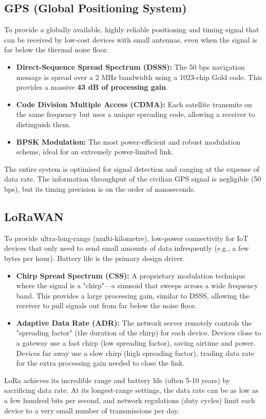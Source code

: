 \subsection{GPS (Global Positioning System)}

 To provide a globally available, highly reliable positioning and timing signal that can be received by low-cost devices with small antennas, even when the signal is far below the thermal noise floor.
\begin{itemize}
    \item \textbf{Direct-Sequence Spread Spectrum (DSSS):} The 50 bps navigation message is spread over a 2 MHz bandwidth using a 1023-chip Gold code. This provides a massive \textbf{43 dB of processing gain}.
    \item \textbf{Code Division Multiple Access (CDMA):} Each satellite transmits on the same frequency but uses a unique spreading code, allowing a receiver to distinguish them.
    \item \textbf{BPSK Modulation:} The most power-efficient and robust modulation scheme, ideal for an extremely power-limited link.
\end{itemize}
 The entire system is optimised for signal detection and ranging at the expense of data rate. The information throughput of the civilian GPS signal is negligible (50 bps), but its timing precision is on the order of nanoseconds.


\subsection{LoRaWAN}

 To provide ultra-long-range (multi-kilometre), low-power connectivity for IoT devices that only need to send small amounts of data infrequently (e.g., a few bytes per hour). Battery life is the primary design driver.
\begin{itemize}
    \item \textbf{Chirp Spread Spectrum (CSS):} A proprietary modulation technique where the signal is a "chirp"—a sinusoid that sweeps across a wide frequency band. This provides a large processing gain, similar to DSSS, allowing the receiver to pull signals out from far below the noise floor.
    \item \textbf{Adaptive Data Rate (ADR):} The network server remotely controls the "spreading factor" (the duration of the chirp) for each device. Devices close to a gateway use a fast chirp (low spreading factor), saving airtime and power. Devices far away use a slow chirp (high spreading factor), trading data rate for the extra processing gain needed to close the link.
\end{itemize}
 LoRa achieves its incredible range and battery life (often 5-10 years) by sacrificing data rate. At its longest-range settings, the data rate can be as low as a few hundred bits per second, and network regulations (duty cycles) limit each device to a very small number of transmissions per day.


